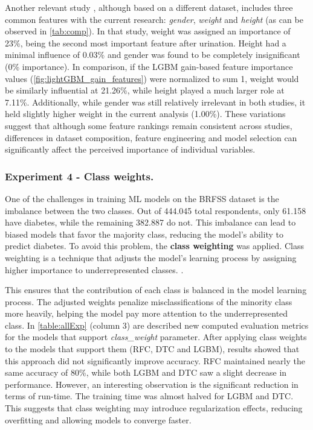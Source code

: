 \documentclass[runningheads]{llncs}
\begin{document}
Another relevant study \cite{GANIE2022100092}, although based on a different dataset, includes three common features with the current research: \textit{gender}, \textit{weight} and \textit{height} (as can be observed in \autoref{tab:comp}). 
In that study, weight was assigned an importance of 23\%, being the second most important feature after urination. Height had a minimal influence of 0.03\% and gender was found to be completely insignificant (0\% importance). 
In comparison, if the LGBM gain-based feature importance values (\autoref{fig:lightGBM_gain_features}) were normalized to sum 1,  weight would be similarly influential at 21.26\%, while height played a much larger role at 7.11\%. Additionally, while gender was still relatively irrelevant in both studies, it held slightly higher weight in the current analysis (1.00\%). These variations suggest that although some feature rankings remain consistent across studies, differences in dataset composition, feature engineering and model selection can significantly affect the perceived importance of individual variables.

\subsubsection{Experiment 4 - Class weights.} 
\label{section:exp_4}
One of the challenges in training ML models on the BRFSS dataset is the imbalance between the two classes. Out of 444.045 total respondents, only 61.158 have diabetes, while the remaining 382.887 do not. This imbalance can lead to biased models that favor the majority class, reducing the model's ability to predict diabetes. To avoid this problem, the \textbf{class weighting} was applied. Class weighting is a technique that adjusts the model's learning process by assigning higher importance to underrepresented classes.
\cite{classWeights2023}. 

This ensures that the contribution of each class is balanced in the model learning process. The adjusted weights penalize misclassifications of the minority class more heavily, helping the model pay more attention to the underrepresented class. 
In \autoref{table:allExp} (column 3) are described new computed evaluation metrics for the models that support \textit{class\_weight} parameter. 
After applying class weights to the models that support them (RFC, DTC and LGBM), results showed that this approach did not significantly improve accuracy. RFC maintained nearly the same accuracy of 80\%, while both LGBM and DTC saw a slight decrease in performance. However, an interesting observation is the significant reduction in terms of run-time. The training time was almost halved for LGBM and DTC. This suggests that class weighting may introduce regularization effects, reducing overfitting and allowing models to converge faster.
\end{document}
